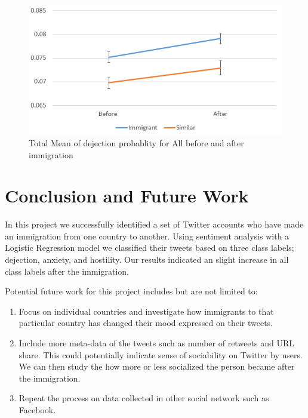 \documentclass{article}
\begin{document}
\begin{figure}[ht]
\vskip 0.1in
\begin{center}
\centerline{\includegraphics[width=\columnwidth]{Figures/totalmean.PNG}}
\caption{Total Mean of dejection probablity for All before and after immigration}
\label{totalmean}
\end{center}
\vskip -0.2in
\end{figure}



\section{Conclusion and Future Work}

In this project we successfully identified a set of Twitter accounts who have made an immigration from one country to another. Using sentiment analysis with a Logistic Regression model we classified their tweets based on three class labels; dejection, anxiety, and hostility. Our results indicated an slight increase in all class labels after the immigration. 

Potential future work for this project includes but are not limited to: 

\begin{enumerate}
    \item Focus on individual countries and investigate how immigrants to that particular country has changed their mood expressed on their tweets. 
    \item Include more meta-data of the tweets such as number of retweets and URL share. This could potentially indicate sense of sociability on Twitter by users. We can then study the how more or less socialized the person became after the immigration. 
    \item Repeat the process on data collected in other social network such as Facebook.
\end{enumerate}
\end{document}
